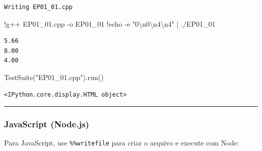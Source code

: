 \documentclass[
  portuguese,
  letterpaper,
  openany,
  oneside,
  12pt,
  a4paper]{book}
\newenvironment{Shaded}{\begin{snugshade}}{\end{snugshade}}
\newcommand{\CharTok}[1]{\textcolor[rgb]{0.13,0.47,0.30}{#1}}
\newcommand{\NormalTok}[1]{\textcolor[rgb]{0.00,0.23,0.31}{#1}}
\newcommand{\OperatorTok}[1]{\textcolor[rgb]{0.37,0.37,0.37}{#1}}
\newcommand{\StringTok}[1]{\textcolor[rgb]{0.13,0.47,0.30}{#1}}
\begin{document}
\begin{verbatim}
Writing EP01_01.cpp
\end{verbatim}

\begin{Shaded}
\begin{Highlighting}[]
\OperatorTok{!}\NormalTok{g}\OperatorTok{++}\NormalTok{ EP01\_01.cpp }\OperatorTok{{-}}\NormalTok{o EP01\_01}
\OperatorTok{!}\NormalTok{echo }\OperatorTok{{-}}\NormalTok{e }\StringTok{"0}\CharTok{\textbackslash{}n}\StringTok{0}\CharTok{\textbackslash{}n}\StringTok{4}\CharTok{\textbackslash{}n}\StringTok{4"} \OperatorTok{|}\NormalTok{ .}\OperatorTok{/}\NormalTok{EP01\_01}
\end{Highlighting}
\end{Shaded}

\begin{verbatim}
5.66
8.00
4.00
\end{verbatim}

\begin{Shaded}
\begin{Highlighting}[]
\NormalTok{TestSuite(}\StringTok{"EP01\_01.cpp"}\NormalTok{).run()}
\end{Highlighting}
\end{Shaded}

\begin{verbatim}
<IPython.core.display.HTML object>
\end{verbatim}

\begin{center}\rule{0.5\linewidth}{0.5pt}\end{center}

\subsubsection{\texorpdfstring{ JavaScript
(Node.js)}{ JavaScript (Node.js)}}\label{javascript-node.js}

Para JavaScript, use \texttt{\%\%writefile} para criar o arquivo e
execute com Node:
\end{document}
